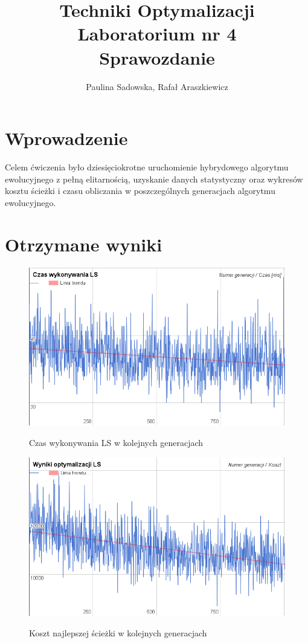 \documentclass[a4paper 10pt]{article}
\title{\textbf{Techniki Optymalizacji} \\
Laboratorium nr 4 \\
Sprawozdanie}
\author{Paulina Sadowska, Rafał Araszkiewicz}
\begin{document}
\maketitle

\section{Wprowadzenie}
Celem ćwiczenia było dziesięciokrotne uruchomienie hybrydowego algorytmu ewolucyjnego z pełną elitarnością, uzyskanie danych statystyczny oraz wykresów kosztu ścieżki i czasu obliczania w poszczególnych generacjach algorytmu ewolucyjnego.

\section{Otrzymane wyniki}


\begin{figure} [H]
\centering
\caption{Czas wykonywania LS w kolejnych generacjach}
\includegraphics[angle=0,width = 1\textwidth, height=!]{images/czas_ls.png}
\label{Rys. Edges}
\end{figure}

\begin{figure} [H]
\centering
\caption{Koszt najlepszej ścieżki w kolejnych generacjach}
\includegraphics[angle=0,width = 1\textwidth, height=!]{images/wyniki_opti.png}
\label{Rys. Node}
\end{figure}
\end{document}
